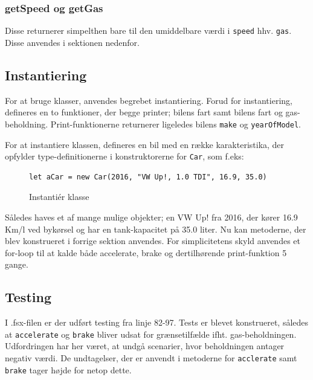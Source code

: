 \documentclass[a4paper,10pt]{article}
\begin{document}
\subsubsection{getSpeed og getGas}

Disse returnerer simpelthen bare til den umiddelbare værdi i \texttt{speed} hhv. \texttt{gas}. Disse anvendes i sektionen nedenfor.

\subsection{Instantiering}
For at bruge klasser, anvendes begrebet instantiering. Forud for instantiering, defineres en to funktioner, der begge printer; bilens fart samt bilens fart og gas-beholdning. Print-funktionerne returnerer ligeledes bilens \texttt{make} og \texttt{yearOfModel}.

For at instantiere klassen, defineres en bil med en række karakteristika, der opfylder type-definitionerne i konstruktorerne for \texttt{Car}, som f.eks:

\begin{figure}[H]
\lstset{language=FSharp}
\begin{lstlisting}
let aCar = new Car(2016, "VW Up!, 1.0 TDI", 16.9, 35.0)
\end{lstlisting}
\centering
\caption{Instantiér klasse}
\label{fig:my_label}
\end{figure}

Således haves et af mange mulige objekter; en VW Up! fra 2016, der kører 16.9 Km/l ved bykørsel og har en tank-kapacitet på 35.0 liter. Nu kan metoderne, der blev konstrueret i forrige sektion anvendes.\newline
For simplicitetens skyld anvendes et for-loop til at kalde både accelerate, brake og dertilhørende print-funktion 5 gange.

\subsection{Testing}
I .fsx-filen er der udført testing fra linje 82-97. Tests er blevet konstrueret, således at \texttt{accelerate} og \texttt{brake} bliver udsat for grænsetilfælde ifht. gas-beholdningen. Udfordringen har her været, at undgå scenarier, hvor beholdningen antager negativ værdi. De undtagelser, der er anvendt i metoderne for \texttt{acclerate} samt \texttt{brake} tager højde for netop dette. 
\end{document}
